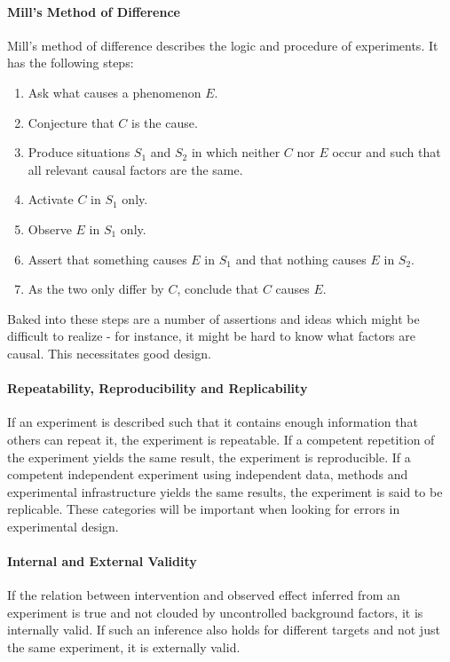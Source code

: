 \paragraph{Mill's Method of Difference}
Mill's method of difference describes the logic and procedure of experiments. It has the following steps:
\begin{enumerate}
	\item Ask what causes a phenomenon $E$.
	\item Conjecture that $C$ is the cause.
	\item Produce situations $S_{1}$ and $S_{2}$ in which neither $C$ nor $E$ occur and such that all relevant causal factors are the same.
	\item Activate $C$ in $S_{1}$ only.
	\item Observe $E$ in $S_{1}$ only.
	\item Assert that something causes $E$ in $S_{1}$ and that nothing causes $E$ in $S_{2}$.
	\item As the two only differ by $C$, conclude that $C$ causes $E$.
\end{enumerate}

Baked into these steps are a number of assertions and ideas which might be difficult to realize - for instance, it might be hard to know what factors are causal. This necessitates good design.

\paragraph{Repeatability, Reproducibility and Replicability}
If an experiment is described such that it contains enough information that others can repeat it, the experiment is repeatable. If a competent repetition of the experiment yields the same result, the experiment is reproducible. If a competent independent experiment using independent data, methods and experimental infrastructure yields the same results, the experiment is said to be replicable. These categories will be important when looking for errors in experimental design.

\paragraph{Internal and External Validity}
If the relation between intervention and observed effect inferred from an experiment is true and not clouded by uncontrolled background factors, it is internally valid. If such an inference also holds for different targets and not just the same experiment, it is externally valid.

